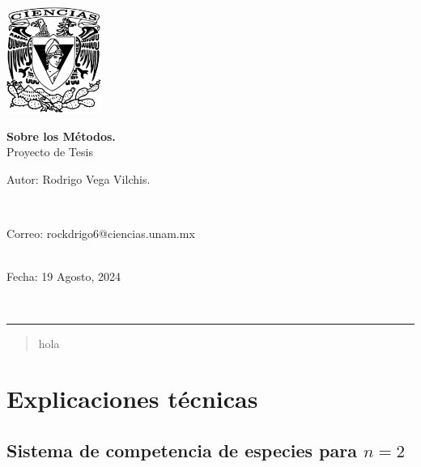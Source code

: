 \documentclass[11pt,a4paper]{article}
\begin{document}
\thispagestyle{empty}
\includegraphics[height=3.5cm]{escudoCiencias.pdf}
\vspace{-3.8cm}
\begin{flushright}
	\hspace{4cm}
	{\Large\textbf{Sobre los Métodos.}\\
		Proyecto de Tesis}
	\vspace{0.3cm}\\
	\begin{large}Autor: Rodrigo Vega Vilchis.\end{large}\\
	\begin{footnotesize}
		Correo: rockdrigo6@ciencias.unam.mx\\
		\\
	\end{footnotesize}
	\vspace{0.1cm}
	\begin{large}
		Fecha: 19 Agosto, 2024\end{large}\\
\end{flushright}
\hrule height1pt\vspace{.5cm}

\begin{abstract}
	hola
\end{abstract} 
	
\section{Explicaciones técnicas}

\subsection{Sistema de competencia de especies para $n=2$}
\end{document}
